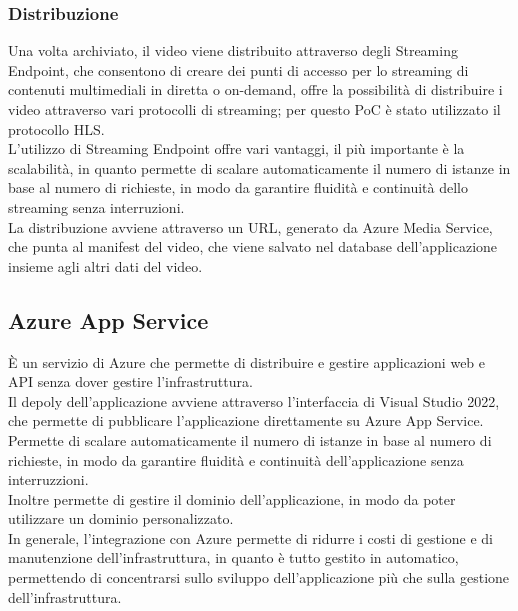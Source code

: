 \subsubsection{Distribuzione}
Una volta archiviato, il video viene distribuito attraverso degli Streaming Endpoint, che consentono di creare dei punti di accesso per lo streaming di contenuti multimediali in diretta o on-demand, offre la possibilità di distribuire i video attraverso vari protocolli di streaming; per questo PoC è stato utilizzato il protocollo HLS.\\
L'utilizzo di Streaming Endpoint offre vari vantaggi, il più importante è la scalabilità, in quanto permette di scalare automaticamente il numero di istanze in base al numero di richieste, in modo da garantire fluidità e continuità dello streaming senza interruzioni.\\
La distribuzione avviene attraverso un URL, generato da Azure Media Service, che punta al manifest del video, che viene salvato nel database dell'applicazione insieme agli altri dati del video.\\


\subsection{Azure App Service}
È un servizio di Azure che permette di distribuire e gestire applicazioni web e API senza dover gestire l'infrastruttura.\\
Il depoly dell'applicazione avviene attraverso l'interfaccia di Visual Studio 2022, che permette di pubblicare l'applicazione direttamente su Azure App Service.\\
Permette di scalare automaticamente il numero di istanze in base al numero di richieste, in modo da garantire fluidità e continuità dell'applicazione senza interruzzioni.\\
Inoltre permette di gestire il dominio dell'applicazione, in modo da poter utilizzare un dominio personalizzato.\\

In generale, l'integrazione con Azure permette di ridurre i costi di gestione e di manutenzione dell'infrastruttura, in quanto è tutto gestito in automatico, permettendo di concentrarsi sullo sviluppo dell'applicazione più che sulla gestione dell'infrastruttura.\\